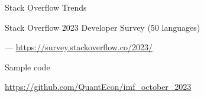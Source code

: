 \documentclass[
    xcolor={svgnames,dvipsnames},
    hyperref={colorlinks, citecolor=DeepPink4, linkcolor=DarkRed, urlcolor=DarkBlue}
    ]{beamer}  %
\newcommand{\1}{\mathbbm 1}
\begin{document}
\begin{frame}

    Stack Overflow Trends

    \begin{figure}
       \begin{center}
       \end{center}
    \end{figure}

\end{frame}


\begin{frame}

    Stack Overflow 2023 Developer Survey (50 languages)


    \begin{figure}
       \begin{center}
       \end{center}
    \end{figure}
    

    \hspace*{\fill}--- \url{https://survey.stackoverflow.co/2023/}


\end{frame}




\begin{frame}
    
    Sample code

    \url{https://github.com/QuantEcon/imf_october_2023}
\end{frame}
\end{document}
